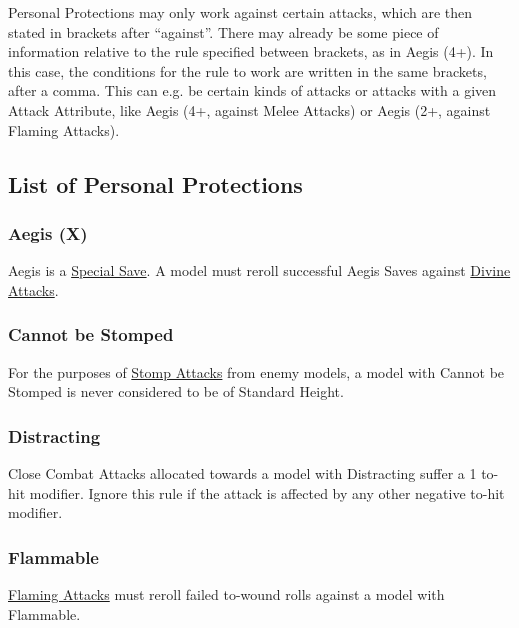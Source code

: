 Personal Protections may only work against certain attacks, which are then stated in brackets after \enquote{against}. There may already be some piece of information relative to the rule specified between brackets, as in Aegis (4+). In this case, the conditions for the rule to work are written in the same brackets, after a comma. This can e.g. be certain kinds of attacks or attacks with a given Attack Attribute, like Aegis (4+, against Melee Attacks) or Aegis (2+, against Flaming Attacks).

\subsection{List of Personal Protections}
\label{list_of_personal_protections}

\subsubsection{Aegis (X)}
\idx[main=y]{\aegis{}}\label{aegis}

Aegis is a \hyperref[special_saves]{Special Save}. A model must reroll successful Aegis Saves against \hyperref[divine_attacks]{Divine Attacks}.

\subsubsection{Cannot be Stomped}
\idx[main=y]{\cannotbestomped}\label{cannot_be_stomped}

For the purposes of \hyperref[stomp_attacks]{Stomp Attacks} from enemy models, a model with Cannot be Stomped is never considered to be of Standard Height.

\subsubsection{Distracting}
\idx[main=y]{\distracting}\label{distracting}

Close Combat Attacks allocated towards a model with Distracting suffer a \minuss{}1 to-hit modifier. Ignore this rule if the attack is affected by any other negative to-hit modifier.

\subsubsection{Flammable}
\idx[main=y]{\flammable}\label{flammable}

\hyperref[flaming_attacks]{Flaming Attacks} must reroll failed to-wound rolls against a model with Flammable.

